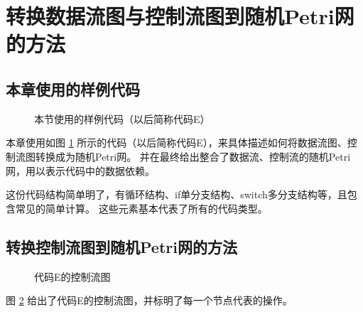 
\section{转换数据流图与控制流图到随机Petri网的方法} \label{sec:convert}

\subsection{本章使用的样例代码} \label{sec:codeeg}

\begin{figure}[!hbt]
\centering
    
\caption{本节使用的样例代码（以后简称代码E）} \label{fig:eg:code}
\end{figure}

本章使用如图 \ref{fig:eg:code} 所示的代码（以后简称代码E），来具体描述如何将数据流图、控制流图转换成为随机Petri网。
并在最终给出整合了数据流、控制流的随机Petri网，用以表示代码中的数据依赖。

这份代码结构简单明了，有循环结构、if单分支结构、switch多分支结构等，且包含常见的简单计算。
这些元素基本代表了所有的代码类型。







\subsection{转换控制流图到随机Petri网的方法}

\newsavebox{\egcfg}
\begin{figure}[!hbt]
\centering
\usebox{\egcfg}
\caption{代码E的控制流图} \label{fig:eg:cfg}
\end{figure}

图 \ref{fig:eg:cfg} 给出了代码E的控制流图，并标明了每一个节点代表的操作。

